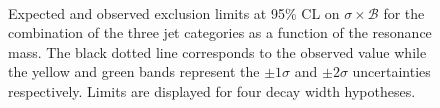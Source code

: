 \begin{figure}[htb]
\centering
{}
\\
\caption{
    Expected and observed exclusion limits at 95\% CL on $\sigma\times\mathcal{B}$ for the combination of the three jet categories as a function of the resonance mass. The black dotted line corresponds to the observed value while the yellow and green bands represent the $\pm 1 \sigma$ and $\pm 2 \sigma$ uncertainties respectively. Limits are displayed for four decay width hypotheses.}
    \label{fig:13TeVcombobslim}
\end{figure}












